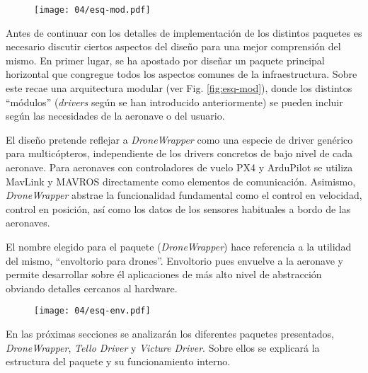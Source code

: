 \documentclass[../main.tex]{subfiles}
\begin{document}
\begin{figure}[!ht]
 	{\texttt{[image: 04/esq-mod.pdf]}}
\end{figure}

Antes de continuar con los detalles de implementación de los distintos paquetes es necesario discutir ciertos aspectos del diseño para una mejor comprensión del mismo. En primer lugar, se ha apostado por diseñar un paquete principal horizontal que congregue todos los aspectos comunes de la infraestructura. Sobre este recae una arquitectura modular (ver Fig. \ref{fig:esq-mod}), donde los distintos ``módulos'' (\emph{drivers} según se han introducido anteriormente) se pueden incluir según las necesidades de la aeronave o del usuario.

El diseño pretende reflejar a \emph{DroneWrapper} como una especie de driver genérico para multicópteros, independiente de los drivers concretos de bajo nivel de cada aeronave. Para aeronaves con controladores de vuelo PX4 y ArduPilot se utiliza MavLink y MAVROS directamente como elementos de comunicación. Asimismo, \emph{DroneWrapper} abstrae la funcionalidad fundamental como el control en velocidad, control en posición, así como los datos de los sensores habituales a bordo de las aeronaves.

El nombre elegido para el paquete (\emph{DroneWrapper}) hace referencia a la utilidad del mismo, ``envoltorio para drones''. Envoltorio pues envuelve a la aeronave y permite desarrollar sobre él aplicaciones de más alto nivel de abstracción obviando detalles cercanos al hardware.

\begin{figure}[!ht]
 	{\texttt{[image: 04/esq-env.pdf]}}
\end{figure}

En las próximas secciones se analizarán los diferentes paquetes presentados, \emph{DroneWrapper}, \emph{Tello Driver} y \emph{Victure Driver}. Sobre ellos se explicará la estructura del paquete y su funcionamiento interno.
\end{document}
